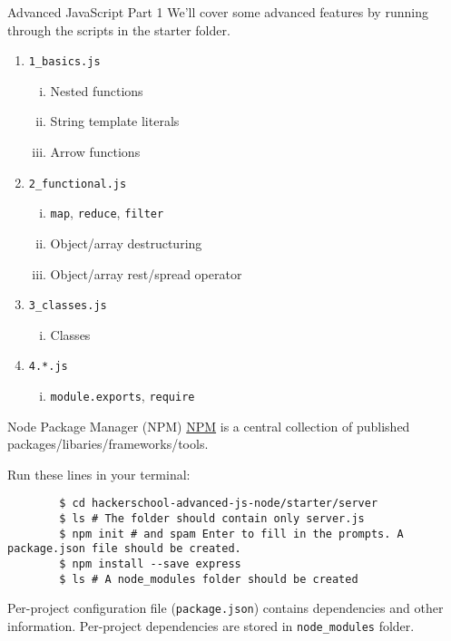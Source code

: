 \documentclass{beamer}
\begin{document}
\begin{frame}[fragile]{Advanced JavaScript Part 1}
    We'll cover some advanced features by running through the scripts in the starter folder.
    \begin{enumerate}
        \item \lstinline{1_basics.js}
            \begin{enumerate}[(i)]
                \item Nested functions
                \item String template literals
                \item Arrow functions
            \end{enumerate}
        \item \lstinline{2_functional.js}
            \begin{enumerate}[(i)]
                \item \texttt{map}, \texttt{reduce}, \texttt{filter}
                \item Object/array destructuring
                \item Object/array rest/spread operator
            \end{enumerate}
        \item \lstinline{3_classes.js}
            \begin{enumerate}[(i)]
                \item Classes
            \end{enumerate}
        \item \lstinline{4.*.js}
            \begin{enumerate}[(i)]
                \item \texttt{module.exports}, \texttt{require}
            \end{enumerate}
    \end{enumerate}
\end{frame}

\begin{frame}[fragile]{Node Package Manager (NPM)}
    \href{https://www.npmjs.com/}{NPM} is a central collection of published packages/libaries/frameworks/tools.

    Run these lines in your terminal:
    \begin{verbatim}
        $ cd hackerschool-advanced-js-node/starter/server
        $ ls # The folder should contain only server.js
        $ npm init # and spam Enter to fill in the prompts. A package.json file should be created.
        $ npm install --save express
        $ ls # A node_modules folder should be created
    \end{verbatim}

    Per-project configuration file (\lstinline{package.json}) contains dependencies and other information. Per-project dependencies are stored in \lstinline{node_modules} folder.
\end{frame}
\end{document}
